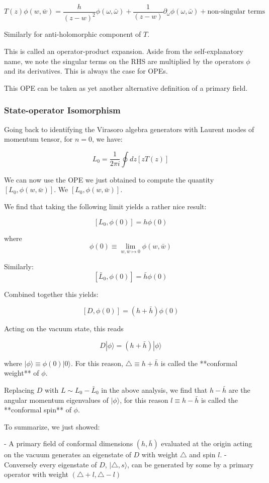 $$T(z) \phi(w, \bar w) = \frac h {(z - w)^2}\phi(\omega, \bar \omega) + \frac 1 {(z - w)} \partial_\omega \phi(\omega, \bar \omega) + \text{non-singular terms}$$

Similarly for anti-holomorphic component of $T$. 

This is called an operator-product expansion. Aside from the self-explanatory name, we note the singular terms on the RHS are multiplied by the operators $\phi$ and its derivatives. This is always the case for OPEs.

This OPE can be taken as yet another alternative definition of a primary field. 


\subsubsection{ State-operator Isomorphism}

Going back to identifying the Virasoro algebra generators with Laurent modes of momentum tensor, for $n = 0$, we have: 

$$L_0 = \frac 1 {2 \pi i} \oint dz [zT(z)]$$

We can now use the OPE we just obtained to compute the quantity
$ [L_0, \phi(w, \bar w)]$. We $ [L_0, \phi(w, \bar w)]$.

We find that taking the following limit yields a rather nice result:

$$[L_0, \phi(0)] = h \phi(0)$$

where $$ \phi(0)\equiv\lim_{w, \bar w \mapsto 0} \phi( w, \bar w)$$

Similarly:
$$[\bar L_0, \phi(0)] = \bar h \phi(0)$$

Combined together this yields:

$$[D, \phi(0)] = (h + \bar h) \phi(0)$$

Acting on the vacuum state, this reads

$$D| \phi\rangle = (h + \bar h) | \phi \rangle$$

where $| \phi\rangle\equiv \phi(0) |0 \rangle$. For this reason, $\triangle \equiv h + \bar h$ is called the **conformal weight** of $\phi$. 

Replacing $D$ with $L \sim L_0 - \bar L_0$ in the above analysis, we find that $ h - \bar h$ are the angular momentum eigenvalues of $|\phi\rangle$, for this reason $l \equiv h - \bar h$ is called the **conformal spin** of $\phi$. 

To summarize, we just showed:

- A primary field of conformal dimensions $(h , \bar h)$ evaluated at the origin acting on the vacuum generates an eigenstate of $D$ with weight $\triangle$ and spin $l$.
- Conversely every eigenstate of $D$,  $|\triangle, s\rangle$, can be generated by some by a primary operator with weight $(\triangle + l, \triangle - l)$

